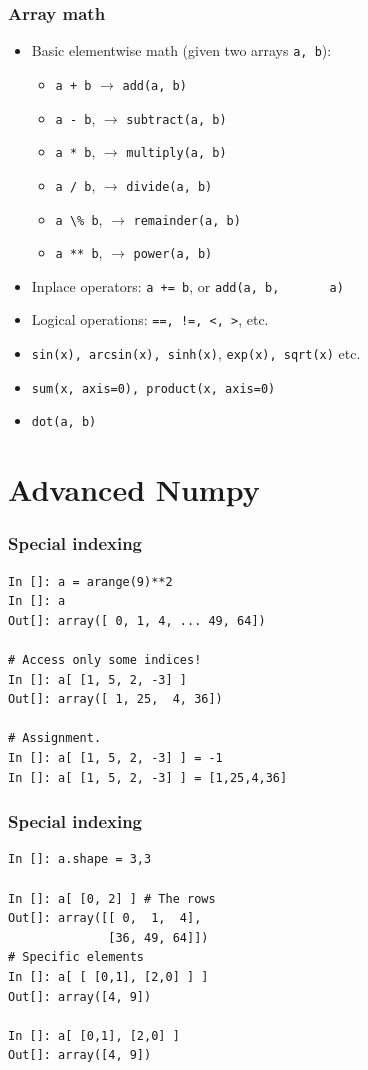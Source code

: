 \documentclass[14pt,compress]{beamer}
\newcommand{\typ}[1]{\lstinline{#1}}
\begin{document}
\begin{frame}[fragile]
  \frametitle{Array math}
  \begin{itemize}
  \item Basic \alert{elementwise} math (given two arrays \typ{a, b}):
    \begin{itemize}
        \item \typ{a + b} $\rightarrow$ \typ{add(a, b)} 
        \item \typ{a - b}, $\rightarrow$ \typ{subtract(a, b)} 
        \item \typ{a * b}, $\rightarrow$ \typ{multiply(a, b)} 
        \item \typ{a / b}, $\rightarrow$ \typ{divide(a, b)} 
        \item \typ{a \% b}, $\rightarrow$ \typ{remainder(a, b)} 
        \item \typ{a ** b}, $\rightarrow$ \typ{power(a, b)}
    \end{itemize}
  \item Inplace operators: \typ{a += b}, or \typ{add(a, b,
      a)}
  \item Logical operations: \typ{==, !=, <, >}, etc.
  \item \typ{sin(x), arcsin(x), sinh(x)},
      \typ{exp(x), sqrt(x)} etc.
  \item \typ{sum(x, axis=0), product(x, axis=0)}
  \item \typ{dot(a, b)}
  \end{itemize}
\end{frame}

\section{Advanced Numpy}

\begin{frame}[fragile]
  \frametitle{Special indexing}
  \begin{lstlisting}
In []: a = arange(9)**2
In []: a
Out[]: array([ 0, 1, 4, ... 49, 64])

# Access only some indices!
In []: a[ [1, 5, 2, -3] ]
Out[]: array([ 1, 25,  4, 36])

# Assignment.
In []: a[ [1, 5, 2, -3] ] = -1
In []: a[ [1, 5, 2, -3] ] = [1,25,4,36]
  \end{lstlisting}
\end{frame}

\begin{frame}[fragile]
  \frametitle{Special indexing}
  \begin{lstlisting}
In []: a.shape = 3,3

In []: a[ [0, 2] ] # The rows
Out[]: array([[ 0,  1,  4],
              [36, 49, 64]])
# Specific elements
In []: a[ [ [0,1], [2,0] ] ]
Out[]: array([4, 9])

In []: a[ [0,1], [2,0] ] 
Out[]: array([4, 9])

  \end{lstlisting}
\end{frame}
\end{document}
